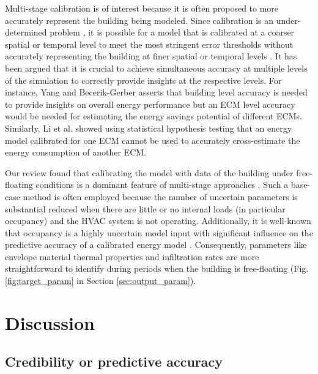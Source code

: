 \documentclass[review]{elsarticle}
\begin{document}
Multi-stage calibration is of interest because it is often proposed to more accurately represent the building being modeled. Since calibration is an under-determined problem \cite{chong2018guidelines}, it is possible for a model that is calibrated at a coarser spatial or temporal level to meet the most stringent error thresholds without accurately representing the building at finer spatial or temporal levels \cite{zuhaib2019application, yin2016linking, raftery2011calibrating}. It has been argued that it is crucial to achieve simultaneous accuracy at multiple levels of the simulation to correctly provide insights at the respective levels. For instance, Yang and Becerik-Gerber \cite{yang2015model} asserts that building level accuracy is needed to provide insights on overall energy performance but an ECM level accuracy would be needed for estimating the energy savings potential of different ECMs. Similarly, Li et al. \cite{li2015why} showed using statistical hypothesis testing that an energy model calibrated for one ECM cannot be used to accurately cross-estimate the energy consumption of another ECM. 

Our review found that calibrating the model with data of the building under free-floating conditions is a dominant feature of multi-stage approaches \cite{cipriano2015evaluation, aparicio-fernandez2019energy, cacabelos2017development, ferrara2020optimizing}. Such a base-case method is often employed because the number of uncertain parameters is substantial reduced when there are little or no internal loads (in particular occupancy) and the HVAC system is not operating. Additionally, it is well-known that occupancy is a highly uncertain model input \cite{yan2015occupant} with significant influence on the predictive accuracy of a calibrated energy model \cite{li2015why, kim2017building, chong2021occupancy}. Consequently, parameters like envelope material thermal properties and infiltration rates are more straightforward to identify during periods when the building is free-floating (Fig. \ref{fig:target_param} in Section \ref{sec:output_param}). 


\section{Discussion}

\subsection{Credibility or predictive accuracy} \label{sec:credibility}
\end{document}
